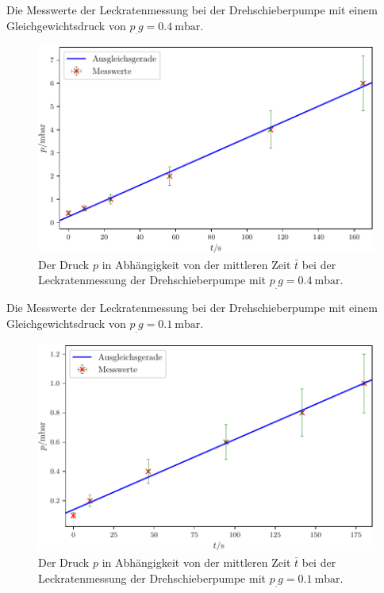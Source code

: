 \newpage
\begin{table}
\centering
\caption{Die Messwerte der Leckratenmessung bei der Drehschieberpumpe mit einem Gleichgewichtsdruck von $p_.g = \SI{0.4}{\milli\bar}$.}

\label{tab:DL3}
\end{table}

\begin{figure}
\centering
\includegraphics[width=\linewidth-70pt,height=\textheight-70pt,keepaspectratio]{content/images/DL3.pdf}
\caption{Der Druck $p$ in Abhängigkeit von der mittleren Zeit $\bar{t}$ bei der Leckratenmessung der Drehschieberpumpe  mit $p_.g = \SI{0.4}{\milli\bar}$.}
\label{fig:DL3}
\end{figure}

\begin{table}
\centering
\caption{Die Messwerte der Leckratenmessung bei der Drehschieberpumpe mit einem Gleichgewichtsdruck von $p_.g = \SI{0.1}{\milli\bar}$.}

\label{tab:DL4}
\end{table}

\begin{figure}
\centering
\includegraphics[width=\linewidth-70pt,height=\textheight-70pt,keepaspectratio]{content/images/DL4.pdf}
\caption{Der Druck $p$ in Abhängigkeit von der mittleren Zeit $\bar{t}$ bei der Leckratenmessung der Drehschieberpumpe  mit $p_.g = \SI{0.1}{\milli\bar}$.}
\label{fig:DL4}
\end{figure}

